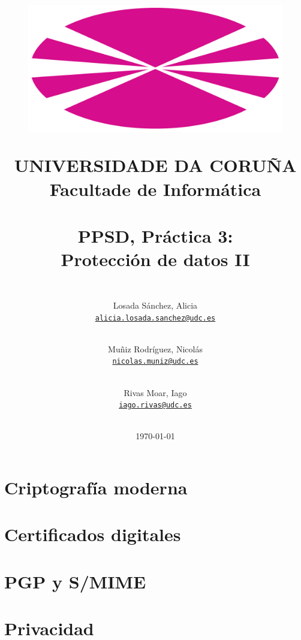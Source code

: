 \documentclass[12pt,a4paper]{article}
\title{
    \begin{figure}[htbp!]
        \begin{center}
        \includegraphics[scale=0.35]{UDC.png}       %
        \end{center}
        \label{fig:udc}
    \end{figure}

    \textsf{UNIVERSIDADE DA CORUÑA} \\
    \textsf{\Large Facultade de Informática} \\
    \hfill \\
    \textbf{PPSD, Práctica 3: \\ Protección de datos II}
}
\author{
    \\
    Losada Sánchez, Alicia \\
    \texttt{\href{mailto:alicia.losada.sanchez@udc.es}{alicia.losada.sanchez@udc.es}}
    \and \\
    Muñiz Rodríguez, Nicolás \\
    \texttt{\href{mailto:nicolas.muniz@udc.es}{nicolas.muniz@udc.es}}
    \and \\
    Rivas Moar, Iago \\
    \texttt{\href{mailto:iago.rivas@udc.es}{iago.rivas@udc.es}}
    \\ \\
}
\date{\today}
\begin{document}
\maketitle

\thispagestyle{empty}

\newpage
{}

\tableofcontents
\thispagestyle{fancy}

\newpage
\fancyfoot[C]{\thepage}

\section{Criptografía moderna}





\section{Certificados digitales}



\section{PGP y S/MIME}







\section{Privacidad}






\end{document}
